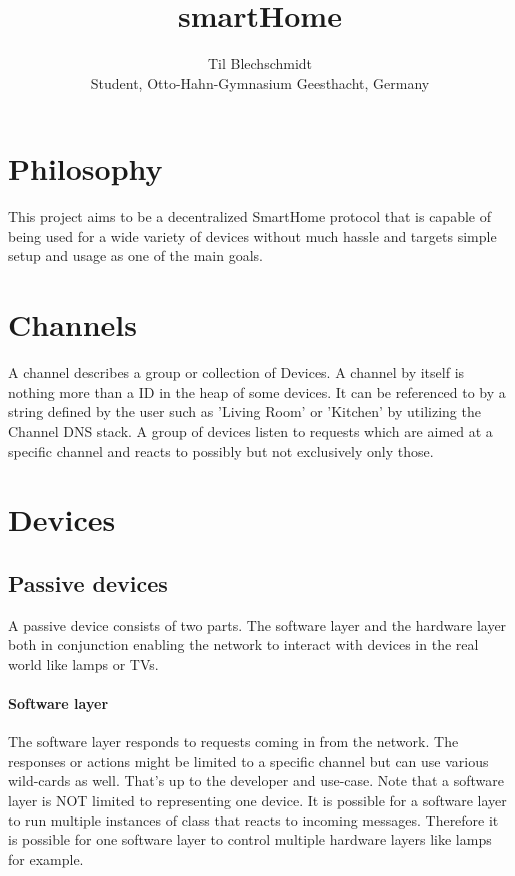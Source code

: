 \documentclass[a4paper]{article}
\title{}
\author{}
\title{smartHome}
\author{Til Blechschmidt\\ Student, Otto-Hahn-Gymnasium Geesthacht, Germany}
\begin{document}
	\maketitle
	\newpage
	
	\tableofcontents
	\listoffigures
	\listoftables
	\newpage
	
	

    \section{Philosophy}
        This project aims to be a decentralized SmartHome protocol that is capable of being used for a wide variety of
        devices without much hassle and targets simple setup and usage as one of the main goals.
	\section{Channels}
	    A channel describes a group or collection of Devices. A channel by itself is nothing more than a ID in the
	    heap of some devices. It can be referenced to by a string defined by the user such as 'Living Room' or 'Kitchen'
	    by utilizing the Channel DNS stack. A group of devices listen to requests which are aimed at a specific channel
	    and reacts to possibly but not exclusively only those.
	\section{Devices}
	    \subsection{Passive devices}
            A passive device consists of two parts. The software layer and the hardware layer both in conjunction
            enabling the network to interact with devices in the real world like lamps or TVs.
            \paragraph{Software layer} The software layer responds to requests coming in from the network. The responses or
                actions might be limited to a specific channel but can use various wild-cards as well. That's up to the
                developer and use-case. Note that a software layer is NOT limited to representing one device. It is possible
                for a software layer to run multiple instances of class that reacts to incoming messages. Therefore it is
                possible for one software layer to control multiple hardware layers like lamps for example.
\end{document}
